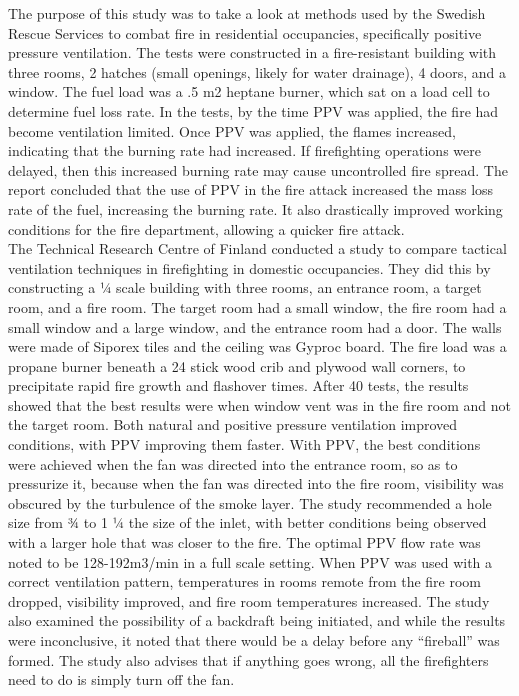 \documentclass{article}
\begin{document}
The purpose of this study was to take a look at methods used by the Swedish Rescue Services to combat fire in residential occupancies, specifically positive pressure ventilation. The tests were constructed in a fire-resistant building with three rooms, 2 hatches (small openings, likely for water drainage), 4 doors, and a window. The fuel load was a .5 m2 heptane burner, which sat on a load cell to determine fuel loss rate. In the tests, by the time PPV was applied, the fire had become ventilation limited. Once PPV was applied, the flames increased, indicating that the burning rate had increased. If firefighting operations were delayed, then this increased burning rate may cause uncontrolled fire spread. The report concluded that the use of PPV in the fire attack increased the mass loss rate of the fuel, increasing the burning rate. It also drastically improved working conditions for the fire department, allowing a quicker fire attack.\cite{SvenssonVentFFOps}\\
	
The Technical Research Centre of Finland conducted a study to compare tactical ventilation techniques in firefighting in domestic occupancies. They did this by constructing a ¼ scale building with three rooms, an entrance room, a target room, and a fire room. The target room had a small window, the fire room had a small window and a large window, and the entrance room had a door. The walls were made of Siporex tiles and the ceiling was Gyproc board. The fire load was a propane burner beneath a 24 stick wood crib and plywood wall corners, to precipitate rapid fire growth and flashover times. After 40 tests, the results showed that the best results were when window vent was in the fire room and not the target room. Both natural and positive pressure ventilation improved conditions, with PPV improving them faster. With PPV, the best conditions were achieved when the fan was directed into the entrance room, so as to pressurize it, because when the fan was directed into the fire room, visibility was obscured by the turbulence of the smoke layer. The study recommended a hole size from ¾ to 1 ¼ the size of the inlet, with better conditions being observed with a larger hole that was closer to the fire. The optimal PPV flow rate was noted to be 128-192m3/min in a full scale setting. When PPV was used with a correct ventilation pattern, temperatures in rooms remote from the fire room dropped, visibility improved, and fire room temperatures increased. The study also examined the possibility of a backdraft being initiated, and while the results were inconclusive, it noted that there would be a delay before any “fireball” was formed. The study also advises that if anything goes wrong, all the firefighters need to do is simply turn off the fan.\cite{TuomisaariPPV}\\
	
\end{document}
